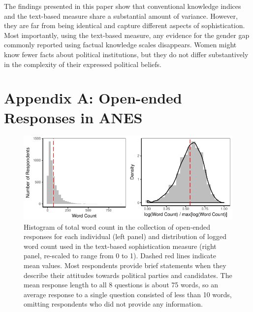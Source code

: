 \documentclass[12pt]{article}
\begin{document}
The findings presented in this paper show that conventional knowledge indices and the text-based measure share a substantial amount of variance. However, they are far from being identical and capture different aspects of sophistication. Most importantly, using the text-based measure, any evidence for the gender gap commonly reported using factual knowledge scales disappears. Women might know fewer facts about political institutions, but they do not differ substantively in the complexity of their expressed political beliefs.


\singlespacing



\clearpage
\section*{Appendix A: Open-ended Responses in ANES}
\renewcommand\thefigure{A.\arabic{figure}}
\renewcommand\thetable{A.\arabic{table}}
\setcounter{figure}{0}
\setcounter{table}{0}

\begin{figure}[h]\centering
\includegraphics{../fig/wc.pdf}
\caption{Histogram of total word count in the collection of open-ended responses for each individual (left panel) and distribution of logged word count used in the text-based sophistication measure (right panel, re-scaled to range from 0 to 1). Dashed red lines indicate mean values. Most respondents provide brief statements when they describe their attitudes towards political parties and candidates. The mean response length to all 8 questions is about 75 words, so an average response to a single question consisted of less than 10 words, omitting respondents who did not provide any information.}\label{fig:wc}
\end{figure}
\end{document}
